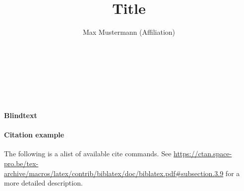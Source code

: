 \documentclass[
12pt,a4paper
]{article}
\author{Max Mustermann (Affiliation)}
\title{Title}
\makeatletter
\renewcommand\maketitle{
  ~\vspace{-1.1cm}\newline
  {\raggedright
    \renewcommand{\baselinestretch}{1.2}\selectfont
  {\bfseries\large\@title}\\[2ex]
  {\large\@author}\\[2ex]
  }
}
\makeatother
\begin{document}
\maketitle

\paragraph{Blindtext} 

\lipsum

\paragraph{Citation example}

The following is a alist of available cite commands. See \url{https://ctan.space-pro.be/tex-archive/macros/latex/contrib/biblatex/doc/biblatex.pdf#subsection.3.9} for a more detailed description.
\end{document}

